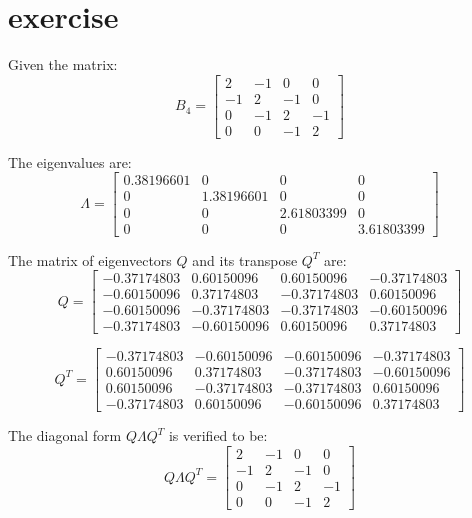 \documentclass{article}
\begin{document}
\section{exercise}

Given the matrix:
\[ B_4 = \begin{bmatrix}
        2  & -1 & 0  & 0  \\
        -1 & 2  & -1 & 0  \\
        0  & -1 & 2  & -1 \\
        0  & 0  & -1 & 2
    \end{bmatrix} \]

The eigenvalues are:
\[ \Lambda = \begin{bmatrix}
        0.38196601 & 0          & 0          & 0          \\
        0          & 1.38196601 & 0          & 0          \\
        0          & 0          & 2.61803399 & 0          \\
        0          & 0          & 0          & 3.61803399
    \end{bmatrix} \]

The matrix of eigenvectors \( Q \) and its transpose \( Q^T \) are:
\[ Q = \begin{bmatrix}
        -0.37174803 & 0.60150096  & 0.60150096  & -0.37174803 \\
        -0.60150096 & 0.37174803  & -0.37174803 & 0.60150096  \\
        -0.60150096 & -0.37174803 & -0.37174803 & -0.60150096 \\
        -0.37174803 & -0.60150096 & 0.60150096  & 0.37174803
    \end{bmatrix} \]

\[ Q^T = \begin{bmatrix}
        -0.37174803 & -0.60150096 & -0.60150096 & -0.37174803 \\
        0.60150096  & 0.37174803  & -0.37174803 & -0.60150096 \\
        0.60150096  & -0.37174803 & -0.37174803 & 0.60150096  \\
        -0.37174803 & 0.60150096  & -0.60150096 & 0.37174803
    \end{bmatrix} \]

The diagonal form \( Q \Lambda Q^T \) is verified to be:
\[ Q \Lambda Q^T = \begin{bmatrix}
        2  & -1 & 0  & 0  \\
        -1 & 2  & -1 & 0  \\
        0  & -1 & 2  & -1 \\
        0  & 0  & -1 & 2
    \end{bmatrix} \]
\end{document}
